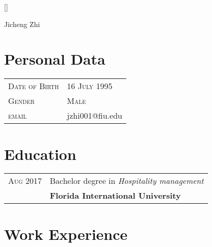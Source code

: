 \documentclass[12pt,a4paper]{article}
\begin{document}
 

\pagestyle{empty}
\setlength{\textwidth}{500pt}

\titleformat{\section}{\large\scshape\raggedright}{}{0em}{}[\titlerule]
\titlespacing{\section}{0pt}{3pt}{3pt}

\par{\centering
		{\Huge Jicheng \Huge{Zhi}
	}\bigskip
	\par}
	
\section{Personal Data}

\noindent\begin{tabular}{p{7cm} l}
	\textsc{Date of Birth} & \textsc{16 July 1995} \\
	\textsc{Gender} & \textsc{Male}\\
    \textsc{email} & jzhi001@fiu.edu
    
\end{tabular}

\section{Education}

\noindent\begin{tabular}{p{5cm} l}
	\textsc{Aug 2017} 
		& Bachelor degree in \emph{Hospitality management}\\
		&\textbf{Florida International University}\\
\end{tabular}

\section{Work Experience}
\end{document}
